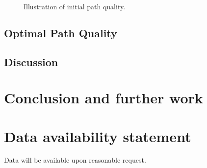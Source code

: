 \documentclass[smallcondensed]{svjour3}     %
\begin{document}
\begin{figure}[h!]
{\begin{minipage}[t]{0.3\linewidth}
		\end{minipage}%
		\label{fig: nodes_taken}
	}
	\caption{
	Illustration of initial path quality.}
	\label{fig:initial path quality}
\end{figure}


\subsection{Optimal Path Quality}



\subsection{Discussion}

\section{Conclusion and further work}\label{section: conclusions}

\begin{acknowledgements}

\end{acknowledgements}

\section*{Data availability statement}
Data will be available upon reasonable request.




\end{document}
